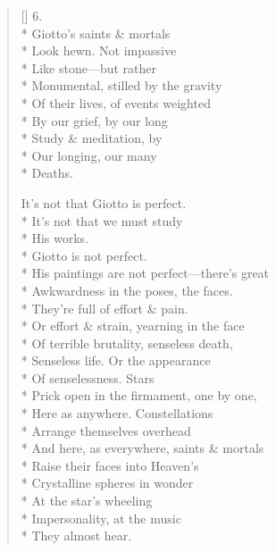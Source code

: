 \begin{verse}[\versewidth]
6.\\*
Giotto's saints \& mortals\\*
Look hewn. Not impassive\\*
Like stone---but rather\\*
Monumental, stilled by the gravity\\*
Of their lives, of events weighted\\*
By our grief, by our long\\*
Study \& meditation, by\\*
Our longing, our many\\*
Deaths.

It's not that Giotto is perfect.\\*
It's not that we must study\\*
His works.\\*
\hspace{2\vgap} Giotto is not perfect.\\*
His paintings are not perfect---there's great\\*
Awkwardness in the poses, the faces.\\*
They're full of effort \& pain.\\*
Or effort \& strain, yearning in the face\\*
Of terrible brutality, senseless death,\\*
Senseless life. Or the appearance\\*
Of senselessness. Stars\\*
Prick open in the firmament, one by one,\\*
Here as anywhere. Constellations\\*
Arrange themselves overhead\\*
And here, as everywhere, saints \& mortals\\*
Raise their faces into Heaven's\\*
Crystalline spheres in wonder\\*
At the star's wheeling\\*
Impersonality, at the music\\*
They almost hear.
\end{verse}
